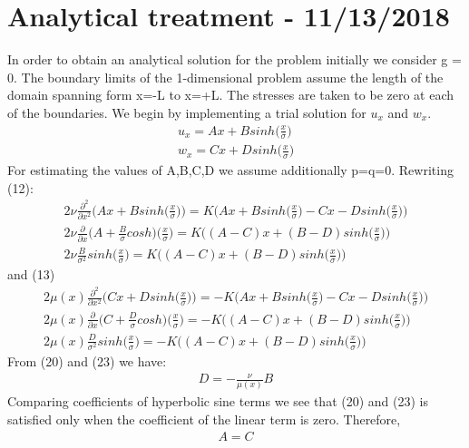 \documentclass[a4paper,oneside,11pt]{report}
\begin{document}
\section*{Analytical treatment - 11/13/2018}
In order to obtain an analytical solution for the problem initially we consider g = 0. The boundary limits of the 1-dimensional problem assume the length of the domain spanning form x=-L to x=+L. The stresses are taken to be zero at each of the boundaries. We begin by implementing a trial solution for $u_x$ and $w_x$.
\begin{align}
u_x = Ax + Bsinh \Big ( \frac{x}{\sigma} \Big )\\
w_x = Cx + Dsinh \Big ( \frac{x}{\sigma} \Big )
\end{align}
For estimating the values of A,B,C,D we assume additionally p=q=0. 
Rewriting (12):
\begin{align}
2\nu\frac{\partial^{2}}{\partial x^2}\Big ( Ax + Bsinh\Big ( \frac{x}{\sigma} \Big ) \Big ) = K \Big ( Ax + Bsinh \Big ( \frac{x}{\sigma} \Big ) - Cx - Dsinh \Big ( \frac{x}{\sigma} \Big )  \Big )\\
2\nu\frac{\partial}{\partial x} \Big ( A + \frac{B}{\sigma}cosh)\Big ( \frac{x}{\sigma} \Big ) = K \Big ((A - C)x + (B - D)sinh\Big ( \frac{x}{\sigma} \Big ) )\\
2\nu\frac{B}{\sigma^2} sinh\Big ( \frac{x}{\sigma} \Big ) = K \Big ( (A - C)x + (B - D)sinh\Big ( \frac{x}{\sigma} \Big )\Big )
\end{align}
and (13)
\begin{align}
2\mu(x)\frac{\partial^{2}}{\partial x^2}\Big ( Cx + Dsinh\Big ( \frac{x}{\sigma} \Big ) \Big ) = -K \Big ( Ax + Bsinh \Big ( \frac{x}{\sigma} \Big ) - Cx - Dsinh \Big ( \frac{x}{\sigma} \Big )  \Big )\\
2\mu(x)\frac{\partial}{\partial x} \Big ( C + \frac{D}{\sigma}cosh)\Big ( \frac{x}{\sigma} \Big ) = -K \Big ((A - C)x + (B - D)sinh\Big ( \frac{x}{\sigma} \Big ) )\\
2\mu(x)\frac{D}{\sigma^2} sinh\Big ( \frac{x}{\sigma} \Big ) = -K \Big ( (A - C)x + (B - D)sinh\Big ( \frac{x}{\sigma} \Big )\Big )
\end{align}
From (20) and (23) we have:
\begin{align}
D = -\frac{\nu}{\mu(x)} B
\end{align}
Comparing coefficients of hyperbolic sine terms we see that (20) and (23) is satisfied only when the coefficient of the linear term is zero. Therefore,
\begin{align}
A = C
\end{align}
\end{document}
